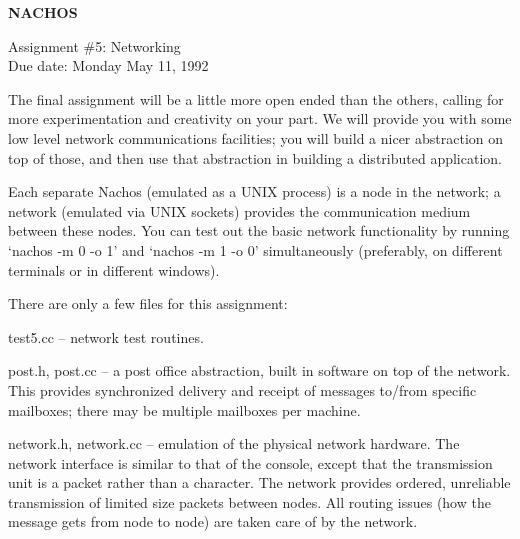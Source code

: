 

\begin{center}
{\large {\bf NACHOS}}


\vspace{.5in}

Assignment \#5: Networking \\
Due date: Monday May 11, 1992
\end{center}

\vspace{.2in}

The final assignment will be a little more open ended than the others,
calling for more experimentation and creativity on your part.  
We will provide you with some low level network communications facilities;
you will build a nicer abstraction on top of those, and then use
that abstraction in building a distributed application.

Each separate Nachos (emulated as a UNIX process) is a node in the network;
a network (emulated via UNIX sockets) provides the communication medium
between these nodes.  You can test out the basic network functionality
by running `nachos -m 0 -o 1' and `nachos -m 1 -o 0' simultaneously 
(preferably, on different terminals or in different windows).

There are only a few files for this assignment:

\begin{description}

\item test5.cc -- network test routines.

\item post.h, post.cc -- a post office abstraction, built in software
on top of the network.  This provides synchronized delivery and
receipt of messages to/from specific mailboxes; there may be multiple
mailboxes per machine.

\item network.h, network.cc -- emulation of the physical network hardware.
The network interface is similar to that of the console, except
that the transmission unit is a packet rather than a character.
The network provides ordered, unreliable transmission of limited
size packets between nodes.  All routing issues (how the message
gets from node to node) are taken care of by the network.

\end{description}

